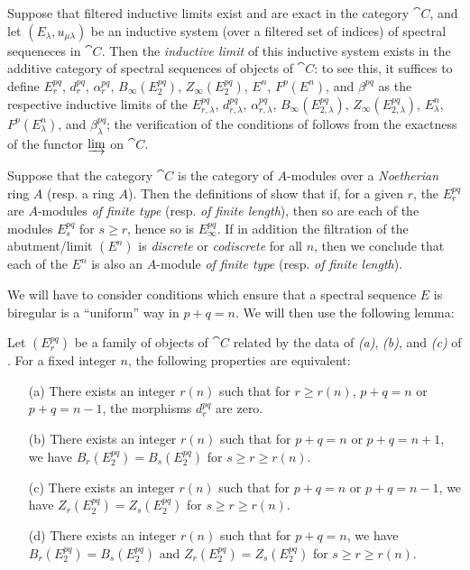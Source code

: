 \begin{env}[11.1.7]
\label{0.11.1.7}
Suppose that filtered inductive limits exist and are exact in the category $\cat{C}$, and let $(E_\lambda,u_{\mu\lambda})$ be an inductive system (over a filtered set of indices) of spectral sequeneces in $\cat{C}$.
Then the \emph{inductive limit} of this inductive system exists in the additive category of spectral sequences of objects of $\cat{C}$: to see this, it suffices to define $E_r^{pq}$, $d_r^{pq}$, $\alpha_r^{pq}$, $B_\infty(E_2^{pq})$, $Z_\infty(E_2^{pq})$, $E^n$, $F^p(E^n)$, and $\beta^{pq}$ as the respective inductive limits of the $E_{r,\lambda}^{pq}$, $d_{r,\lambda}^{pq}$, $\alpha_{r,\lambda}^{pq}$, $B_\infty(E_{2,\lambda}^{pq})$, $Z_\infty(E_{2,\lambda}^{pq})$, $E_\lambda^n$, $F^p(E_\lambda^n)$, and $\beta_\lambda^{pq}$; the verification of the conditions of  follows from the exactness of the functor $\varinjlim$ on $\cat{C}$.
\end{env}

\begin{remark}[11.1.8]
\label{0.11.1.8}
Suppose that the category $\cat{C}$ is the category of $A$-modules over a \emph{Noetherian} ring $A$ (resp. a ring $A$).
Then the definitions of  show that if, for a given $r$, the $E_r^{pq}$ are $A$-modules \emph{of finite type} (resp. \emph{of finite length}), then so are each of the modules $E_s^{pq}$ for $s\geq r$, hence so is $E_\infty^{pq}$.
If in addition the filtration of the abutment/limit $(E^n)$ is \emph{discrete} or \emph{codiscrete} for all $n$, then we conclude that each of the $E^n$ is also an $A$-module \emph{of finite type} (resp. \emph{of finite length}).
\end{remark}

\begin{env}[11.1.9]
\label{0.11.1.9}
We will have to consider conditions which ensure that a spectral sequence $E$ is biregular is a ``uniform'' way in $p+q=n$.
We will then use the following lemma:
\end{env}

\begin{lemma}[11.1.10]
\label{0.11.1.10}
Let $(E_r^{pq})$ be a family of objects of $\cat{C}$ related by the data of \emph{(a)}, \emph{(b)}, and \emph{(c)} of .
For a fixed integer $n$, the following properties are equivalent:
\begin{enumerate}
  \item[{\rm(a)}] There exists an integer $r(n)$ such that for $r\geq r(n)$, $p+q=n$ or $p+q=n-1$, the morphisms $d_r^{pq}$ are zero.
  \item[{\rm(b)}] There exists an integer $r(n)$ such that for $p+q=n$ or $p+q=n+1$, we have $B_r(E_2^{pq})=B_s(E_2^{pq})$ for $s\geq r\geq r(n)$.
  \item[{\rm(c)}] There exists an integer $r(n)$ such that for $p+q=n$ or $p+q=n-1$, we have $Z_r(E_2^{pq})=Z_s(E_2^{pq})$ for $s\geq r\geq r(n)$.
  \item[{\rm(d)}] There exists an integer $r(n)$ such that for $p+q=n$, we have $B_r(E_2^{pq})=B_s(E_2^{pq})$ and $Z_r(E_2^{pq})=Z_s(E_2^{pq})$ for $s\geq r\geq r(n)$.
\end{enumerate}
\end{lemma}


